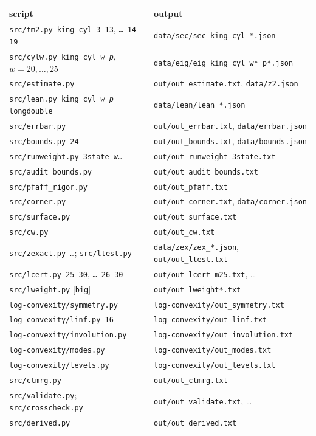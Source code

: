 \documentclass[11pt]{amsart}
\theoremstyle{definition}
\theoremstyle{remark}
\newcommand{\file}[1]{\texttt{#1}}
\begin{document}
\begin{center}\small
\begin{tabular}{ll}
\toprule
script & output \\
\midrule
\texttt{src/tm2.py king cyl 3 13}, \texttt{\dots\ 14 19} & \file{data/sec/sec\_king\_cyl\_*.json} \\
\texttt{src/cylw.py king cyl \textit{w} \textit{p}}, $w = 20, \dots, 25$ & \file{data/eig/eig\_king\_cyl\_w*\_p*.json} \\
\texttt{src/estimate.py} & \file{out/out\_estimate.txt}, \file{data/z2.json} \\
\texttt{src/lean.py king cyl \textit{w} \textit{p} longdouble} & \file{data/lean/lean\_*.json} \\
\texttt{src/errbar.py} & \file{out/out\_errbar.txt}, \file{data/errbar.json} \\
\texttt{src/bounds.py 24} & \file{out/out\_bounds.txt}, \file{data/bounds.json} \\
\texttt{src/runweight.py 3state \textit{w}\dots} & \file{out/out\_runweight\_3state.txt} \\
\texttt{src/audit\_bounds.py} & \file{out/out\_audit\_bounds.txt} \\
\texttt{src/pfaff\_rigor.py} & \file{out/out\_pfaff.txt} \\
\texttt{src/corner.py} & \file{out/out\_corner.txt}, \file{data/corner.json} \\
\texttt{src/surface.py} & \file{out/out\_surface.txt} \\
\texttt{src/cw.py} & \file{out/out\_cw.txt} \\
\texttt{src/zexact.py \dots}; \texttt{src/ltest.py} & \file{data/zex/zex\_*.json}, \file{out/out\_ltest.txt} \\
\texttt{src/lcert.py 25 30}, \texttt{\dots\ 26 30} & \file{out/out\_lcert\_m25.txt}, \dots \\
\texttt{src/lweight.py} [\texttt{big}] & \file{out/out\_lweight*.txt} \\
\texttt{log-convexity/symmetry.py} & \file{log-convexity/out\_symmetry.txt} \\
\texttt{log-convexity/linf.py 16} & \file{log-convexity/out\_linf.txt} \\
\texttt{log-convexity/involution.py} & \file{log-convexity/out\_involution.txt} \\
\texttt{log-convexity/modes.py} & \file{log-convexity/out\_modes.txt} \\
\texttt{log-convexity/levels.py} & \file{log-convexity/out\_levels.txt} \\
\texttt{src/ctmrg.py} & \file{out/out\_ctmrg.txt} \\
\texttt{src/validate.py}; \texttt{src/crosscheck.py} & \file{out/out\_validate.txt}, \dots \\
\texttt{src/derived.py} & \file{out/out\_derived.txt} \\
\bottomrule
\end{tabular}
\end{center}
\end{document}
